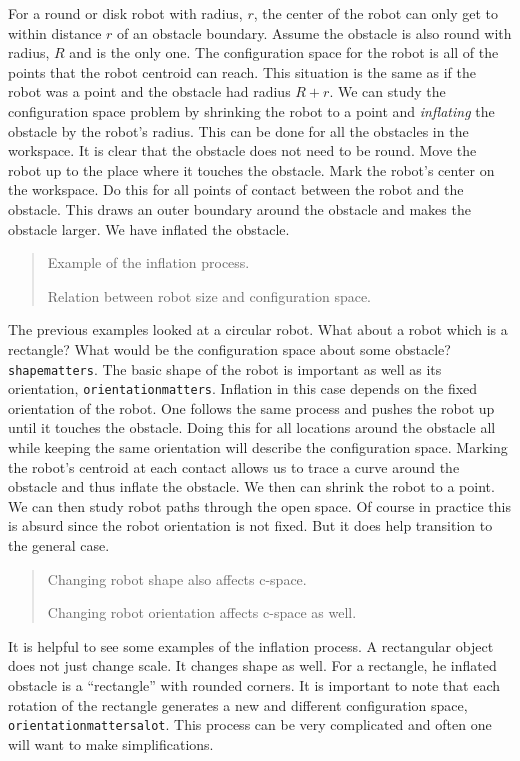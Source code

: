 For a round or disk robot with radius, \(r\), the center of the robot
can only get to within distance \(r\) of an obstacle boundary. Assume
the obstacle is also round with radius, \(R\) and is the only one. The
configuration space for the robot is all of the points that the robot
centroid can reach. This situation is the same as if the robot was a
point and the obstacle had radius \(R+r\). We can study the
configuration space problem by shrinking the robot to a point and
\emph{inflating} the obstacle by the robot's radius. This can be done
for all the obstacles in the workspace. It is clear that the obstacle
does not need to be round. Move the robot up to the place where it
touches the obstacle. Mark the robot's center on the workspace. Do this
for all points of contact between the robot and the obstacle. This draws
an outer boundary around the obstacle and makes the obstacle larger. We
have inflated the obstacle.

\begin{quote}
Example of the inflation process.

Relation between robot size and configuration space.
\end{quote}

The previous examples looked at a circular robot. What about a robot
which is a rectangle? What would be the configuration space about some
obstacle? \texttt{shapematters}. The basic shape of the robot is
important as well as its orientation, \texttt{orientationmatters}.
Inflation in this case depends on the fixed orientation of the robot.
One follows the same process and pushes the robot up until it touches
the obstacle. Doing this for all locations around the obstacle all while
keeping the same orientation will describe the configuration space.
Marking the robot's centroid at each contact allows us to trace a curve
around the obstacle and thus inflate the obstacle. We then can shrink
the robot to a point. We can then study robot paths through the open
space. Of course in practice this is absurd since the robot orientation
is not fixed. But it does help transition to the general case.

\begin{quote}
Changing robot shape also affects c-space.

Changing robot orientation affects c-space as well.
\end{quote}

It is helpful to see some examples of the inflation process. A
rectangular object does not just change scale. It changes shape as well.
For a rectangle, he inflated obstacle is a ``rectangle'' with rounded
corners. It is important to note that each rotation of the rectangle
generates a new and different configuration space,
\texttt{orientationmattersalot}. This process can be very complicated
and often one will want to make simplifications.

